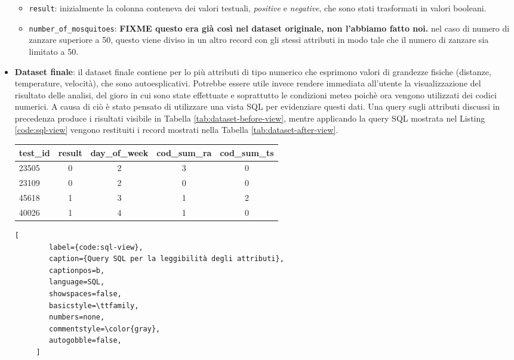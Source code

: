 \begin{itemize}
\begin{itemize}
		\item \texttt{result}: inizialmente la colonna conteneva dei valori  
		testuali, \textit{positive} e \textit{negative}, che sono stati 
		trasformati in valori booleani.  
		
    \item \texttt{number\_of\_mosquitoes}: \textbf{FIXME questo era già 
		così nel dataset originale, non l'abbiamo fatto noi.} nel caso di 
		numero di zanzare superiore a 50, questo viene diviso in un altro 
		record con gli stessi attributi in modo tale che il numero di zanzare 
		sia limitato a 50.  
			
	\end{itemize}
	
	\item \textbf{Dataset finale}: il dataset finale contiene per lo più 
	attributi di tipo numerico che esprimono valori di grandezze fisiche 
	(distanze, temperature, velocità), che sono autoesplicativi. Potrebbe 
	essere utile invece rendere immediata all'utente la visualizzazione del 
	risultato delle analisi, del gioro in cui sono state effettuate e 
	soprattutto le condizioni meteo poichè ora vengono utilizzati dei codici 
	numerici. A causa di ciò è stato pensato di utilizzare una vista SQL per 
	evidenziare questi dati. Una query sugli attributi discussi in precedenza 
	produce i risultati visibile in Tabella \ref{tab:dataset-before-view}, 
	mentre applicando la query SQL mostrata nel Listing \ref{code:sql-view} 
	vengono restituiti i record mostrati nella 
	Tabella \ref{tab:dataset-after-view}.

	\vspace{.5em}
	\begin{centering}
		\begin{tabular}{lcccc}
			\toprule
			test\_id & result & day\_of\_week & cod\_sum\_ra & cod\_sum\_ts \\
			\midrule
			23505 & 0 & 2 & 3 & 0 \\
			23109 &	0 & 2 & 0 & 0 \\
			45618 &	1 & 3 & 1 & 2 \\
			40026 &	1 & 4 & 1 & 0 \\
			\bottomrule
		\end{tabular}
		\label{tab:dataset-before-view}
	\end{centering}

	\begin{lstlisting}[
		label={code:sql-view},
		caption={Query SQL per la leggibilità degli attributi},
		captionpos=b,
		language=SQL,
		showspaces=false,
		basicstyle=\ttfamily,
		numbers=none,
		commentstyle=\color{gray},
		autogobble=false,
	 ]


\end{lstlisting}
\end{itemize}

